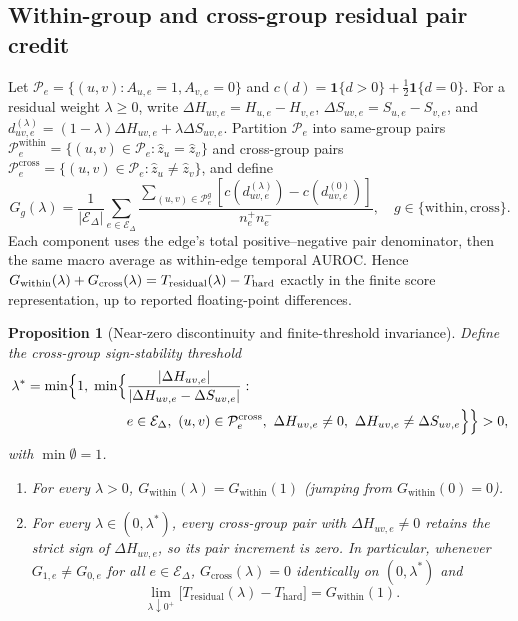 \documentclass[11pt]{article}
\newtheorem{proposition}{Proposition}
\begin{document}
\subsection{Within-group and cross-group residual pair credit}
\label{app:residual-pairs}
Let $\mathcal P_e=\{(u,v):A_{u,e}=1,A_{v,e}=0\}$ and
$c(d)=\mathbf1\{d>0\}+\tfrac12\mathbf1\{d=0\}$. For a residual weight
$\lambda\ge 0$, write $\Delta H_{uv,e}=H_{u,e}-H_{v,e}$,
$\Delta S_{uv,e}=S_{u,e}-S_{v,e}$, and
$d^{(\lambda)}_{uv,e}=(1-\lambda)\Delta H_{uv,e}+\lambda\Delta S_{uv,e}$.
Partition $\mathcal P_e$ into same-group pairs
$\mathcal P_e^{\mathrm{within}}=\{(u,v)\in\mathcal P_e:\widehat z_u=\widehat z_v\}$
and cross-group pairs
$\mathcal P_e^{\mathrm{cross}}=\{(u,v)\in\mathcal P_e:\widehat z_u\neq\widehat z_v\}$,
and define
\begin{equation}
G_g(\lambda)=\frac1{|\mathcal E_\Delta|}\sum_{e\in\mathcal E_\Delta}
\frac{\sum_{(u,v)\in\mathcal P_e^{g}}
 [c(d^{(\lambda)}_{uv,e})-c(d^{(0)}_{uv,e})]}{n_e^+n_e^-},
\quad g\in\{\mathrm{within},\mathrm{cross}\}.
\end{equation}
Each component uses the edge's total positive--negative pair denominator,
then the same macro average as within-edge temporal AUROC. Hence
$G_{\rm within}(\lambda)+G_{\rm cross}(\lambda)=T_{\rm residual}(\lambda)-T_{\rm hard}$
exactly in the finite score representation, up to reported floating-point differences.

\begin{proposition}[Near-zero discontinuity and finite-threshold invariance]
\label{prop:supp-residual-jump}
Define the cross-group sign-stability threshold
\begin{equation*}
\begin{aligned}
\lambda^*=\min\Bigl\{1,\;\min\Bigl\{&\frac{|\Delta H_{uv,e}|}{|\Delta H_{uv,e}-\Delta S_{uv,e}|}: \\
&e\in\mathcal E_\Delta,\ (u,v)\in\mathcal P_e^{\mathrm{cross}},\
\Delta H_{uv,e}\neq 0,\ \Delta H_{uv,e}\neq\Delta S_{uv,e}\Bigr\}\Bigr\}>0,
\end{aligned}
\end{equation*}
with $\min\emptyset=1$.
\begin{enumerate}
\item[(i)] For every $\lambda>0$, $G_{\mathrm{within}}(\lambda)=G_{\mathrm{within}}(1)$
(jumping from $G_{\mathrm{within}}(0)=0$).
\item[(ii)] For every $\lambda\in(0,\lambda^*)$, every cross-group pair with
$\Delta H_{uv,e}\neq 0$ retains the strict sign of $\Delta H_{uv,e}$, so its
pair increment is zero. In particular, whenever $G_{1,e}\neq G_{0,e}$ for all
$e\in\mathcal E_\Delta$, $G_{\mathrm{cross}}(\lambda)=0$ identically on
$(0,\lambda^*)$ and
\[
\lim_{\lambda\downarrow 0^+}\bigl[T_{\mathrm{residual}}(\lambda)-T_{\mathrm{hard}}\bigr]
=G_{\mathrm{within}}(1).
\]
\end{enumerate}
\end{proposition}
\end{document}
